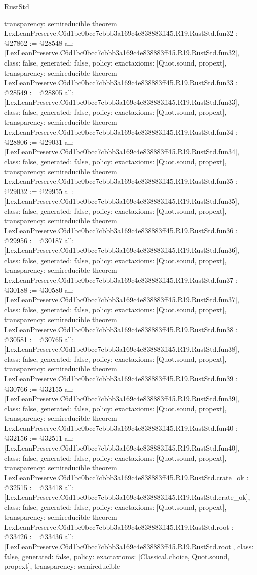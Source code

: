 \begin{lexlean}{RustStd}
\begin{coremodule}
{  transparency: semireducible
}
theorem LexLeanPreserve.C6d1bc0bcc7cbbb3a169c4e838883ff45.R19.RustStd.fun32 : @27862 := @28548 {
  all: [LexLeanPreserve.C6d1bc0bcc7cbbb3a169c4e838883ff45.R19.RustStd.fun32],
  class: false,
  generated: false,
  policy: exact{axioms: [Quot.sound, propext]},
  transparency: semireducible
}
theorem LexLeanPreserve.C6d1bc0bcc7cbbb3a169c4e838883ff45.R19.RustStd.fun33 : @28549 := @28805 {
  all: [LexLeanPreserve.C6d1bc0bcc7cbbb3a169c4e838883ff45.R19.RustStd.fun33],
  class: false,
  generated: false,
  policy: exact{axioms: [Quot.sound, propext]},
  transparency: semireducible
}
theorem LexLeanPreserve.C6d1bc0bcc7cbbb3a169c4e838883ff45.R19.RustStd.fun34 : @28806 := @29031 {
  all: [LexLeanPreserve.C6d1bc0bcc7cbbb3a169c4e838883ff45.R19.RustStd.fun34],
  class: false,
  generated: false,
  policy: exact{axioms: [Quot.sound, propext]},
  transparency: semireducible
}
theorem LexLeanPreserve.C6d1bc0bcc7cbbb3a169c4e838883ff45.R19.RustStd.fun35 : @29032 := @29955 {
  all: [LexLeanPreserve.C6d1bc0bcc7cbbb3a169c4e838883ff45.R19.RustStd.fun35],
  class: false,
  generated: false,
  policy: exact{axioms: [Quot.sound, propext]},
  transparency: semireducible
}
theorem LexLeanPreserve.C6d1bc0bcc7cbbb3a169c4e838883ff45.R19.RustStd.fun36 : @29956 := @30187 {
  all: [LexLeanPreserve.C6d1bc0bcc7cbbb3a169c4e838883ff45.R19.RustStd.fun36],
  class: false,
  generated: false,
  policy: exact{axioms: [Quot.sound, propext]},
  transparency: semireducible
}
theorem LexLeanPreserve.C6d1bc0bcc7cbbb3a169c4e838883ff45.R19.RustStd.fun37 : @30188 := @30580 {
  all: [LexLeanPreserve.C6d1bc0bcc7cbbb3a169c4e838883ff45.R19.RustStd.fun37],
  class: false,
  generated: false,
  policy: exact{axioms: [Quot.sound, propext]},
  transparency: semireducible
}
theorem LexLeanPreserve.C6d1bc0bcc7cbbb3a169c4e838883ff45.R19.RustStd.fun38 : @30581 := @30765 {
  all: [LexLeanPreserve.C6d1bc0bcc7cbbb3a169c4e838883ff45.R19.RustStd.fun38],
  class: false,
  generated: false,
  policy: exact{axioms: [Quot.sound, propext]},
  transparency: semireducible
}
theorem LexLeanPreserve.C6d1bc0bcc7cbbb3a169c4e838883ff45.R19.RustStd.fun39 : @30766 := @32155 {
  all: [LexLeanPreserve.C6d1bc0bcc7cbbb3a169c4e838883ff45.R19.RustStd.fun39],
  class: false,
  generated: false,
  policy: exact{axioms: [Quot.sound, propext]},
  transparency: semireducible
}
theorem LexLeanPreserve.C6d1bc0bcc7cbbb3a169c4e838883ff45.R19.RustStd.fun40 : @32156 := @32511 {
  all: [LexLeanPreserve.C6d1bc0bcc7cbbb3a169c4e838883ff45.R19.RustStd.fun40],
  class: false,
  generated: false,
  policy: exact{axioms: [Quot.sound, propext]},
  transparency: semireducible
}
theorem LexLeanPreserve.C6d1bc0bcc7cbbb3a169c4e838883ff45.R19.RustStd.crate_ok : @32515 := @33418 {
  all: [LexLeanPreserve.C6d1bc0bcc7cbbb3a169c4e838883ff45.R19.RustStd.crate_ok],
  class: false,
  generated: false,
  policy: exact{axioms: [Quot.sound, propext]},
  transparency: semireducible
}
theorem LexLeanPreserve.C6d1bc0bcc7cbbb3a169c4e838883ff45.R19.RustStd.root : @33426 := @33436 {
  all: [LexLeanPreserve.C6d1bc0bcc7cbbb3a169c4e838883ff45.R19.RustStd.root],
  class: false,
  generated: false,
  policy: exact{axioms: [Classical.choice, Quot.sound, propext]},
  transparency: semireducible
}


\end{coremodule}
\end{lexlean}
